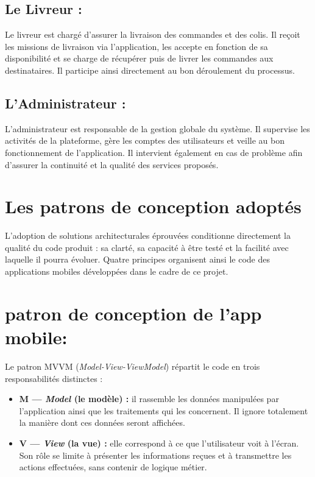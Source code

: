 \documentclass[12pt,fleqn,a4paper]{report}
\begin{document}
\begin{justify}
\subsection{Le Livreur :}
Le livreur est chargé d'assurer la livraison des commandes et des colis. Il reçoit les missions de livraison via l'application, les accepte en fonction de sa disponibilité et se charge de récupérer puis de livrer les commandes aux destinataires. Il participe ainsi directement au bon déroulement du processus.

\subsection{L'Administrateur :}
L'administrateur est responsable de la gestion globale du système. Il supervise les activités de la plateforme, gère les comptes des utilisateurs et veille au bon fonctionnement de l'application. Il intervient également en cas de problème afin d'assurer la continuité et la qualité des services proposés.
\section{Les patrons de conception adoptés}

L'adoption de solutions architecturales éprouvées conditionne directement la
qualité du code produit : sa clarté, sa capacité à être testé et la facilité
avec laquelle il pourra évoluer. Quatre principes organisent ainsi le code des
applications mobiles développées dans le cadre de ce projet.
\section{patron de conception de l'app mobile: }
Le patron MVVM (\textit{Model-View-ViewModel}) répartit le code en trois
responsabilités distinctes :

\begin{itemize}
    \item \textbf{M --- \textit{Model} (le modèle) :} il rassemble les données
    manipulées par l'application ainsi que les traitements qui les concernent.
    Il ignore totalement la manière dont ces données seront affichées.

    \item \textbf{V --- \textit{View} (la vue) :} elle correspond à ce que
    l'utilisateur voit à l'écran. Son rôle se limite à présenter les
    informations reçues et à transmettre les actions effectuées, sans contenir
    de logique métier.


\end{itemize}
\end{justify}
\end{document}
